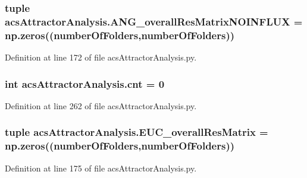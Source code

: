 \hypertarget{a00090_a0d0e0ed8583e4aa041fa6c122324311e}{
\subsubsection[{A\-N\-G\-\_\-overall\-Res\-Matrix\-N\-O\-I\-N\-F\-L\-U\-X}]{\setlength{\rightskip}{0pt plus 5cm}tuple acs\-Attractor\-Analysis.\-A\-N\-G\-\_\-overall\-Res\-Matrix\-N\-O\-I\-N\-F\-L\-U\-X = np.\-zeros(({\bf number\-Of\-Folders},{\bf number\-Of\-Folders}))}}\label{a00090_a0d0e0ed8583e4aa041fa6c122324311e}


Definition at line 172 of file acs\-Attractor\-Analysis.\-py.

\hypertarget{a00090_a8ec106a228fafb4c290946a7b7f8b6da}{
\subsubsection[{cnt}]{\setlength{\rightskip}{0pt plus 5cm}int acs\-Attractor\-Analysis.\-cnt = 0}}\label{a00090_a8ec106a228fafb4c290946a7b7f8b6da}


Definition at line 262 of file acs\-Attractor\-Analysis.\-py.

\hypertarget{a00090_a920167afed4efad8feefc27bdbadba89}{
\subsubsection[{E\-U\-C\-\_\-overall\-Res\-Matrix}]{\setlength{\rightskip}{0pt plus 5cm}tuple acs\-Attractor\-Analysis.\-E\-U\-C\-\_\-overall\-Res\-Matrix = np.\-zeros(({\bf number\-Of\-Folders},{\bf number\-Of\-Folders}))}}\label{a00090_a920167afed4efad8feefc27bdbadba89}


Definition at line 175 of file acs\-Attractor\-Analysis.\-py.

